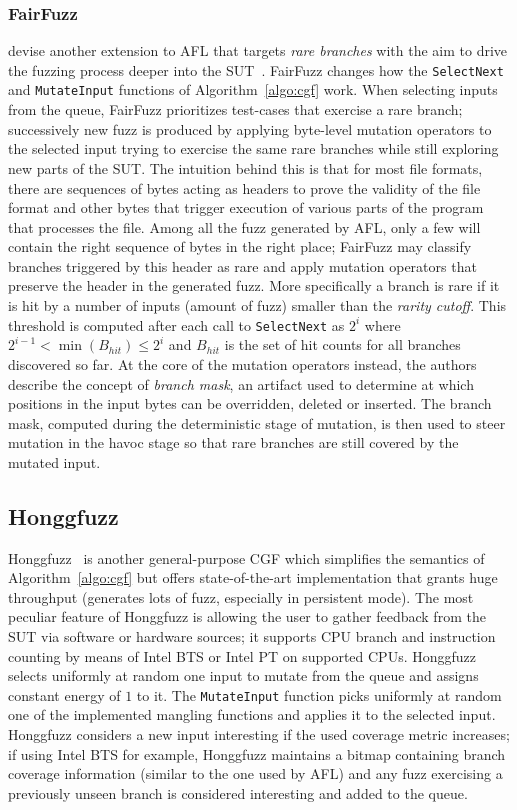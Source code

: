 \subsubsection{FairFuzz}
\citeauthor{lemieux2017fairfuzz} devise another extension to AFL that targets
\emph{rare branches} with the aim to drive the fuzzing process deeper into the
\ac{SUT}~\cite{lemieux2017fairfuzz}. FairFuzz changes how the
\texttt{SelectNext} and \texttt{MutateInput} functions of
Algorithm~\ref{algo:cgf} work. When selecting inputs from the queue, FairFuzz
prioritizes test-cases that exercise a rare branch; successively new fuzz is
produced by applying byte-level mutation operators to the selected input trying
to exercise the same rare branches while still exploring new parts of the
\ac{SUT}. The intuition behind this is that for most file formats, there are
sequences of bytes acting as headers to prove the validity of the file format
and other bytes that trigger execution of various parts of the program that
processes the file. Among all the fuzz generated by AFL, only a few will contain
the right sequence of bytes in the right place; FairFuzz may classify branches
triggered by this header as rare and apply mutation operators that preserve the
header in the generated fuzz. More specifically a branch is rare if it is hit by
a number of inputs (amount of fuzz) smaller than the \emph{rarity cutoff}. This
threshold is computed after each call to \texttt{SelectNext} as $2^i$ where
$2^{i-1} < \min(B_{hit}) \le 2^i$ and $B_{hit}$ is the set of hit counts for all
branches discovered so far. At the core of the mutation operators instead, the
authors describe the concept of \emph{branch mask}, an artifact used to
determine at which positions in the input bytes can be overridden, deleted or
inserted. The branch mask, computed during the deterministic stage of mutation,
is then used to steer mutation in the havoc stage so that rare branches are
still covered by the mutated input.

\subsection{Honggfuzz}
Honggfuzz~\cite{honggfuzz} is another general-purpose \ac{CGF} which simplifies
the semantics of Algorithm~\ref{algo:cgf} but offers state-of-the-art
implementation that grants huge throughput (generates lots of fuzz, especially
in persistent mode). The most peculiar feature of Honggfuzz is allowing the user
to gather feedback from the \ac{SUT} via software or hardware sources; it
supports CPU branch and instruction counting by means of Intel \ac{BTS} or Intel
\ac{PT} on supported CPUs. Honggfuzz selects uniformly at random one input to
mutate from the queue and assigns constant energy of $1$ to it. The
\texttt{MutateInput} function picks uniformly at random one of the implemented
mangling functions and applies it to the selected input. Honggfuzz considers a
new input interesting if the used coverage metric increases; if using Intel
\ac{BTS} for example, Honggfuzz maintains a bitmap containing branch coverage
information (similar to the one used by AFL) and any fuzz exercising a
previously unseen branch is considered interesting and added to the queue.

